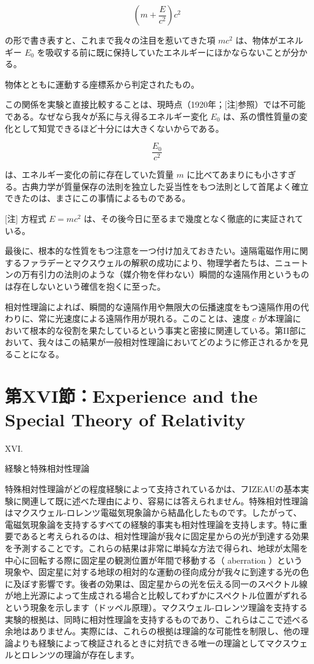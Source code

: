 \documentclass[a4paper,11pt,openany]{ltjsbook}
\begin{document}
\[ (m + \frac{E}{c^2}) c^2 \]



の形で書き表すと、これまで我々の注目を惹いてきた項 $mc^2$ は、物体がエネルギー $E_0$ を吸収する前に既に保持していたエネルギーにほかならないことが分かる。

 物体とともに運動する座標系から判定されたもの。

この関係を実験と直接比較することは、現時点（1920年；[注]参照）では不可能である。なぜなら我々が系に与え得るエネルギー変化 $E_0$ は、系の慣性質量の変化として知覚できるほど十分には大きくないからである。



\[ \frac{E_0}{c^2} \]



は、エネルギー変化の前に存在していた質量 $m$ に比べてあまりにも小さすぎる。古典力学が質量保存の法則を独立した妥当性をもつ法則として首尾よく確立できたのは、まさにこの事情によるものである。

[注] 方程式 $E = mc^2$ は、その後今日に至るまで幾度となく徹底的に実証されている。

最後に、根本的な性質をもつ注意を一つ付け加えておきたい。遠隔電磁作用に関するファラデーとマクスウェルの解釈の成功により、物理学者たちは、ニュートンの万有引力の法則のような（媒介物を伴わない）瞬間的な遠隔作用というものは存在しないという確信を抱くに至った。

相対性理論によれば、瞬間的な遠隔作用や無限大の伝播速度をもつ遠隔作用の代わりに、常に光速度による遠隔作用が現れる。このことは、速度 $c$ が本理論において根本的な役割を果たしているという事実と密接に関連している。第II部において、我々はこの結果が一般相対性理論においてどのように修正されるかを見ることになる。


\clearpage
\chapter{第XVI節：Experience and the Special Theory of Relativity}

XVI.

経験と特殊相対性理論

特殊相対性理論がどの程度経験によって支持されているかは、フIZEAUの基本実験に関連して既に述べた理由により、容易には答えられません。特殊相対性理論はマクスウェル-ロレンツ電磁気現象論から結晶化したものです。したがって、電磁気現象論を支持するすべての経験的事実も相対性理論を支持します。特に重要であると考えられるのは、相対性理論が我々に固定星からの光が到達する効果を予測することです。これらの結果は非常に単純な方法で得られ、地球が太陽を中心に回転する際に固定星の観測位置が年間で移動する（ aberration ）という現象や、固定星に対する地球の相対的な運動の径向成分が我々に到達する光の色に及ぼす影響です。後者の効果は、固定星からの光を伝える同一のスペクトル線が地上光源によって生成される場合と比較してわずかにスペクトル位置がずれるという現象を示します（ドッペル原理）。マクスウェル-ロレンツ理論を支持する実験的根拠は、同時に相対性理論を支持するものであり、これらはここで述べる余地はありません。実際には、これらの根拠は理論的な可能性を制限し、他の理論よりも経験によって検証されるときに対抗できる唯一の理論としてマクスウェルとロレンツの理論が存在します。
\end{document}
